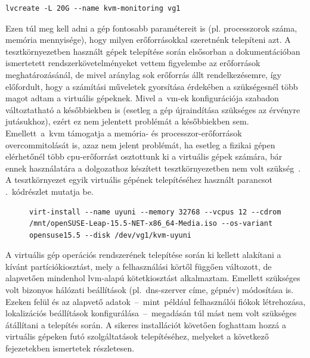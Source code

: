 \vspace{2mm}
\begin{lstlisting}[caption=Virtuális gépek logikai kötetének létrehozásához használt parancs.,label=lst:lvcreate]
	lvcreate -L 20G --name kvm-monitoring vg1
\end{lstlisting}

Ezen túl meg kell adni a gép fontosabb paramétereit is (pl. processzorok száma, memória mennyisége), hogy milyen erőforrásokkal szeretnénk telepíteni azt. A tesztkörnyezetben használt gépek telepítése során elsősorban a dokumentációban ismertetett rendszerkövetelményeket vettem figyelembe az erőforrások meghatározásánál, de mivel aránylag sok erőforrás állt rendelkezésemre, így előfordult, hogy a számítási műveletek gyorsítása érdekében a szükségesnél több magot adtam a virtuális gépeknek. Mivel a~\acrshort{vm}-ek konfigurációja szabadon változtatható a későbbiekben is (esetleg a gép újraindítása szükséges az érvényre jutásukhoz), ezért ez nem jelentett problémát a későbbiekben sem. Emellett~a~\acrshort{kvm} támogatja a memória- és processzor-erőforrások \gls{overcommit}olását is, azaz nem jelent problémát, ha esetleg a fizikai gépen elérhetőnél több \acrshort{cpu}-erőforrást osztottunk ki a virtuális gépek számára, bár ennek használatára a dolgozathoz készített tesztkörnyezetben nem volt szükség~\cite{RedHatKvmOvercommit}.
A tesztkörnyezet egyik virtuális gépének telepítéséhez használt parancsot .~kódrészlet mutatja be.

\vspace{2mm}
\begin{figure}[htb]
\begin{lstlisting}[caption=Virtuális gép telepítése a \texttt{virt-install} segédprogrammal.,label=lst:virtinstall]
	virt-install --name uyuni --memory 32768 --vcpus 12 --cdrom /mnt/openSUSE-Leap-15.5-NET-x86_64-Media.iso --os-variant opensuse15.5 --disk /dev/vg1/kvm-uyuni\end{lstlisting}
\end{figure}

A virtuális gép operációs rendszerének telepítése során ki kellett alakítani a kívánt partíciókiosztást, mely a felhasználási körtől függően változott, de alapvetően mindenhol \acrshort{lvm}-alapú kötetkiosztást alkalmaztam. Emellett szükséges volt bizonyos hálózati beállítások (pl.~\acrshort{dns}-szerver címe, gépnév) módosítása is. Ezeken felül és az alapvető adatok~--~mint~például felhasználói fiókok létrehozása, lokalizációs beállítások konfigurálása~--~megadásán túl mást nem volt szükséges átállítani a telepítés során. A sikeres installációt követően foghattam hozzá a virtuális gépeken futó szolgáltatások telepítéséhez, melyeket a következő fejezetekben ismertetek részletesen.
